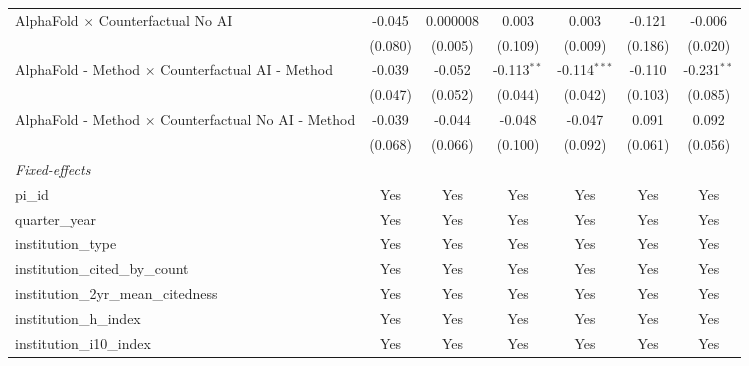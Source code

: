 \begin{tabular}{lcccccc}
   AlphaFold $\times$ Counterfactual No AI                     & -0.045        & 0.000008      & 0.003         & 0.003          & -0.121        & -0.006\\   
                                                               & (0.080)       & (0.005)       & (0.109)       & (0.009)        & (0.186)       & (0.020)\\   
   AlphaFold - Method $\times$ Counterfactual AI - Method      & -0.039        & -0.052        & -0.113$^{**}$ & -0.114$^{***}$ & -0.110        & -0.231$^{**}$\\   
                                                               & (0.047)       & (0.052)       & (0.044)       & (0.042)        & (0.103)       & (0.085)\\   
   AlphaFold - Method $\times$ Counterfactual No AI - Method   & -0.039        & -0.044        & -0.048        & -0.047         & 0.091         & 0.092\\   
                                                               & (0.068)       & (0.066)       & (0.100)       & (0.092)        & (0.061)       & (0.056)\\   
   \midrule
   \emph{Fixed-effects}\\
   pi\_id                                                      & Yes           & Yes           & Yes           & Yes            & Yes           & Yes\\  
   quarter\_year                                               & Yes           & Yes           & Yes           & Yes            & Yes           & Yes\\  
   institution\_type                                           & Yes           & Yes           & Yes           & Yes            & Yes           & Yes\\  
   institution\_cited\_by\_count                               & Yes           & Yes           & Yes           & Yes            & Yes           & Yes\\  
   institution\_2yr\_mean\_citedness                           & Yes           & Yes           & Yes           & Yes            & Yes           & Yes\\  
   institution\_h\_index                                       & Yes           & Yes           & Yes           & Yes            & Yes           & Yes\\  
   institution\_i10\_index                                     & Yes           & Yes           & Yes           & Yes            & Yes           & Yes\\  

\end{tabular}

